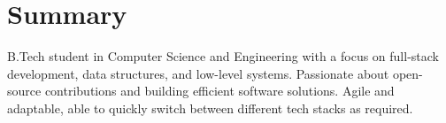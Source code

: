 \section{Summary}
B.Tech student in Computer Science and Engineering with a focus on full-stack development, data structures, and low-level systems. Passionate about open-source contributions and building efficient software solutions. Agile and adaptable, able to quickly switch between different tech stacks as required.